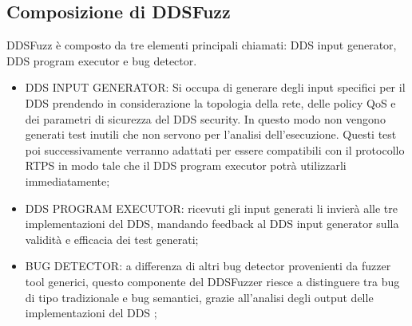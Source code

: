 \subsection{Composizione di DDSFuzz}
DDSFuzz è composto da tre elementi principali chiamati: 
DDS input generator, DDS program executor e bug detector.
\begin{itemize}
    \item DDS INPUT GENERATOR: Si occupa di generare degli input 
    specifici per il DDS prendendo in considerazione la topologia
    della rete, delle policy QoS e dei parametri di sicurezza del 
    DDS security. In questo modo non vengono generati test inutili 
    che non servono per l'analisi dell'esecuzione. 
    Questi test poi successivamente verranno adattati per essere 
    compatibili con il 
    protocollo RTPS in modo tale che il DDS program executor
    potrà utilizzarli
    immediatamente;
    \item DDS PROGRAM EXECUTOR: ricevuti gli input generati 
    li invierà alle
    tre implementazioni del DDS, mandando feedback  al DDS input generator
    sulla validità e efficacia dei test generati;
    \item BUG DETECTOR: a differenza di altri bug detector provenienti da 
    fuzzer tool generici, questo componente del DDSFuzzer riesce
    a distinguere tra bug 
    di tipo tradizionale e bug semantici, grazie all'analisi
    degli output delle implementazioni del DDS
    \cite{10.1145/3691620.3695073};
\end{itemize}